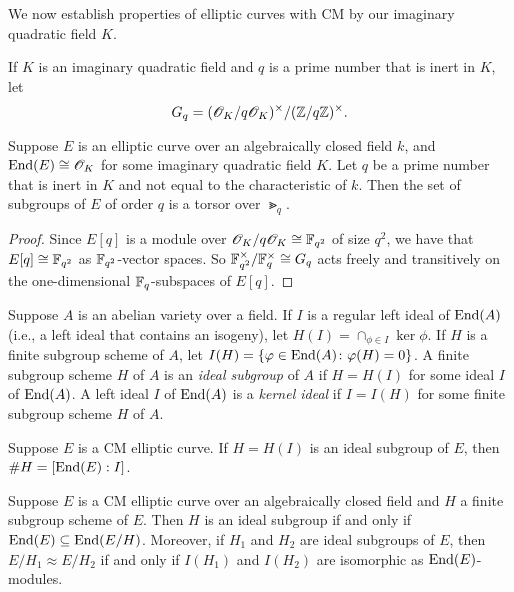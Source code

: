 \documentclass{amsart}
\begin{document}
We now establish properties of elliptic curves with CM by our imaginary quadratic field $K$.
\begin{definition}
  If $K$ is an imaginary quadratic field and $q$ is a prime number that is inert in $K$, let
  $$G_q=(\mathscr{O}_K/q\mathscr{O}_K)^\times/(\mathbb{Z}/q\mathbb{Z})^\times. $$
\end{definition}

\begin{lemma}\label{lem:c-torsor}
  Suppose $E$ is an elliptic curve over an algebraically closed field $k$, and $\operatorname{End}(E) \cong \mathscr{O}_K$ for some imaginary quadratic field $K$. Let $q$ be a prime number that is inert in $K$ and not equal to the characteristic of $k$. Then the set of subgroups of $E$ of order $q$ is a torsor over $\Gt_q$.
\end{lemma}
\begin{proof}
  Since $E[q]$ is a module over $\mathscr{O}_K/q\mathscr{O}_K \cong \mathbb{F}_{q^2}$  of size $q^2$, we have that $E[q] \cong \mathbb{F}_{q^2}$ as $\mathbb{F}_{q^2}$-vector spaces. So $\mathbb{F}_{q^2}^\times/\mathbb{F}_q^\times \cong G_q$ acts freely and transitively on the one-dimensional $\mathbb{F}_q$-subspaces of $E[q]$.
\end{proof}

\begin{definition}\label{def:ker-idl}
  Suppose $A$ is an abelian variety over a field. If $I$ is a regular left ideal of $\operatorname{End}(A)$ (i.e., a left ideal that contains an isogeny), let $H(I) = \cap_{\phi \in I}\ker \phi$. If $H$ is a finite subgroup scheme of $A$, let $I(H) = \{\varphi \in \operatorname{End}(A) \colon \varphi(H) = 0\}$. A finite subgroup scheme $H$ of $A$ is an \emph{ideal subgroup} of $A$ if $H = H(I)$ for some ideal $I$ of $\operatorname{End}(A)$. A left ideal $I$ of $\operatorname{End}(A)$ is a \emph{kernel ideal} if $I = I(H)$ for some finite subgroup scheme $H$ of $A$.
\end{definition}

\begin{lemma}\label{lemma:order-ideal-subgroup}
  Suppose $E$ is a CM elliptic curve. If $H = H(I)$ is an ideal subgroup of $E$, then $\# H = [\operatorname{End}(E):I]$.
\end{lemma}

\begin{theorem}\label{thm:kani-20b}
  Suppose $E$ is a CM elliptic curve over an algebraically closed field and $H$ a finite subgroup scheme of $E$. Then $H$ is an ideal %
  subgroup if and only if %
  $\operatorname{End}(E) \subseteq \operatorname{End}(E/H)$. Moreover, if $H_1$ and $H_2$ are ideal subgroups of $E$, then $E/H_1 \approx E/H_2$ if and only if $I(H_1)$ and $I(H_2)$ are isomorphic as $\operatorname{End}(E)$-modules.
\end{theorem}
\end{document}
